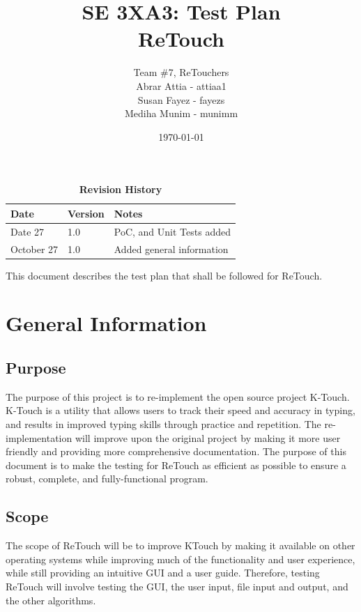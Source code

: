 \documentclass[12pt, titlepage]{article}
\title{SE 3XA3: Test Plan\\ReTouch}
\author{Team \#7, ReTouchers
		\\ Abrar Attia - attiaa1
		\\ Susan Fayez - fayezs
		\\ Mediha Munim - munimm
}
\date{\today}
\begin{document}
\maketitle

\tableofcontents
\listoftables
\listoffigures

\begin{table}[bp]
\caption{\bf Revision History}
\begin{tabularx}{\textwidth}{p{3cm}p{2cm}X}
\toprule {\bf Date} & {\bf Version} & {\bf Notes}\\
\midrule
Date 27 & 1.0 & PoC, and Unit Tests added\\
October 27 & 1.0 & Added general information\\
\bottomrule
\end{tabularx}
\end{table}

\newpage


This document describes the test plan that shall be followed for ReTouch.

\section{General Information}

\subsection{Purpose}

	The purpose of this project is to re-implement the open source project K-Touch. K-Touch is a utility that allows users to track their speed and accuracy in typing, and results in improved typing skills through practice and repetition. The re-implementation will improve upon the original project by making it more user friendly and providing more comprehensive documentation. The purpose of this document is to make the testing for ReTouch as efficient as possible to ensure a robust, complete, and fully-functional program.

\subsection{Scope}

	The scope of ReTouch will be to improve KTouch by making it available on other operating systems while improving much of the functionality and user experience, while still providing an intuitive GUI and a user guide. Therefore, testing ReTouch will involve testing the GUI, the user input, file input and output, and the other algorithms. 
\end{document}
